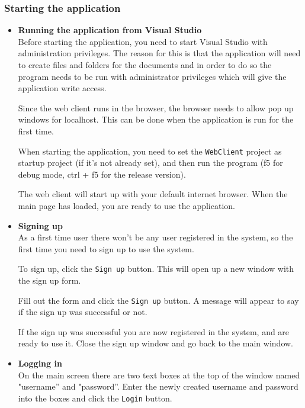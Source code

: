 \documentclass[11pt]{article}
\begin{document}
\subsubsection{Starting the application}
\label{sec-3-4-1}
\begin{itemize}

\item \textbf{Running the application from Visual Studio}\\
\label{sec-3-4-1-1}%
Before starting the application, you need to start Visual Studio with administration privileges.
The reason for this is that the application will need to create files and folders for the documents and in order to do so the program needs to be run with administrator privileges which will give the application write access.

Since the web client runs in the browser, the browser needs to allow pop up windows for localhost.
This can be done when the application is run for the first time.

When starting the application, you need to set the \texttt{WebClient} project as startup project (if it's not already set), and then run the program (f5 for debug mode, ctrl + f5 for the release version).

The web client will start up with your default internet browser. 
When the main page has loaded, you are ready to use the application.

\item \textbf{Signing up} \\
\label{sec-3-4-1-2}%
As a first time user there won't be any user registered in the system, so the first time you need to sign up to use the system.

To sign up, click the \texttt{Sign up} button. This will open up a new window with the sign up form.

Fill out the form and click the \texttt{Sign up} button. A message will appear to say if the sign up was successful or not.

If the sign up was successful you are now registered in the system, and are ready to use it. 
Close the sign up window and go back to the main window.

\item \textbf{Logging in}\\
\label{sec-3-4-1-3}%
On the main screen there are two text boxes at the top of the window named "username'' and "password''.
Enter the newly created username and password into the boxes and click the \texttt{Login} button.
\end{itemize} %
\end{document}
